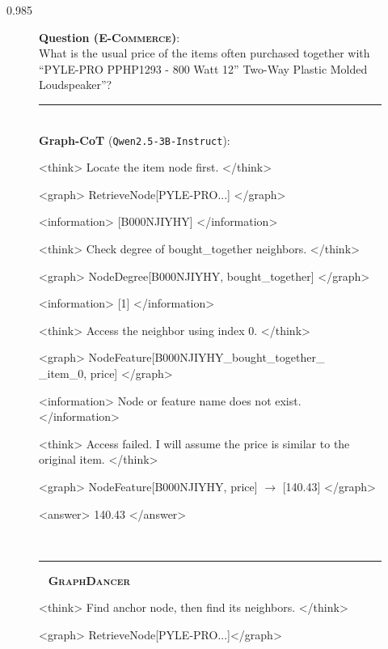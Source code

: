 \documentclass[11pt]{article}
\newcommand{\ours}{\textsc{GraphDancer}\xspace}
\begin{document}
\begin{spacing}{0.985}
\begin{figure}[t]
\centering
\begin{tcolorbox}[
    colback=teal!10!white,
    colframe=teal!40!white,
    title=,
    fonttitle=\small,
    coltitle=black,
    boxsep=0.75mm,
    left=1.5mm,
    right=1.5mm,
    top=1mm,
    bottom=1mm
    ]
    \scriptsize
    \textbf{Question (\textsc{E-Commerce})}: \\
    {\ttfamily What is the usual price of the items often purchased together with ``PYLE-PRO PPHP1293 - 800 Watt 12'' Two-Way Plastic Molded Loudspeaker''?} \\
    \rule{\linewidth}{0.5pt} \\
    \textbf{Graph-CoT} (\texttt{Qwen2.5-3B-Instruct}): \\
    {\ttfamily
    <think> Locate the item node first. </think> \par
    <graph> RetrieveNode[PYLE-PRO...] </graph> \par
    <information> [B000NJIYHY] </information> \par
    <think> Check degree of bought\_together neighbors. </think> \par
    <graph> NodeDegree[B000NJIYHY, bought\_together] </graph> \par
    <information> [1] </information> \par
    {\color{myred} <think> Access the neighbor using index 0. </think>} \par
    {\color{myred} <graph> NodeFeature[B000NJIYHY\_bought\_together\_\\\_item\_0, price] </graph>} \par
    {\color{myred} <information> Node or feature name does not exist. </information>} \par
    <think> Access failed. I will assume the price is similar to the original item. </think> \par
    <graph> NodeFeature[B000NJIYHY, price] $\rightarrow$ [140.43] </graph> \par
    <answer> 140.43 </answer> 
    } \\
    \rule{\linewidth}{0.5pt} \
    \textbf{\ours} \\
    {\ttfamily
    <think> Find anchor node, then find its neighbors. </think> \par
    <graph> RetrieveNode[PYLE-PRO...]</graph> \par
}
\end{tcolorbox}
\end{figure}
\end{spacing}
\end{document}
